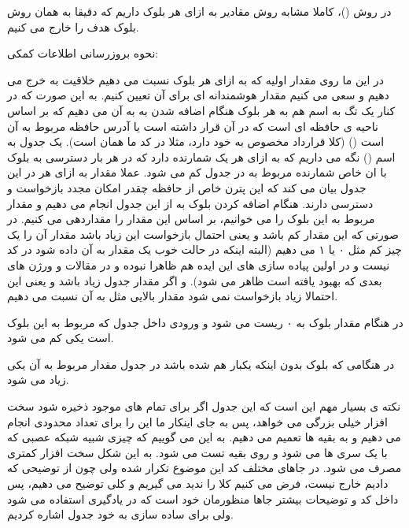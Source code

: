 \documentclass[12pt,a4paper]{article}
\begin{document}
در روش  ()، کاملا مشابه روش  مقادیر  به ازای هر بلوک داریم که دقیقا به همان روش  بلوک هدف را خارج می کنیم.

نحوه بروزرسانی اطلاعات کمکی:

در این  ما روی مقدار اولیه  که به ازای هر بلوک نسبت می دهیم خلاقیت به خرج می دهیم و سعی می کنیم مقدار هوشمندانه ای برای آن تعیین کنیم. به این صورت که در کنار  یک تگ به اسم  هم به هر بلوک هنگام اضافه شدن به  به آن می دهیم که بر اساس ناحیه ی حافظه ای است که در آن قرار داشته است یا آدرس حافظه مربوط به آن است () (کلا قرارداد مخصوص به خود دارد، مثلا در کد ما همان  است). یک جدول به اسم  () نگه می داریم که به ازای هر  یک شمارنده دارد که در هر بار دسترسی به بلوک با ان  خاص شمارنده مربوط به  در جدول کم می شود. عملا مقدار به ازای هر  در این جدول بیان می کند که این پترن خاص از حافظه چقدر امکان مجدد بازخواست و دسترسی دارند. هنگام اضافه کردن بلوک به  از این جدول  انجام می دهیم و مقدار مربوط به  این بلوک را می خوانیم، بر اساس این مقدار  را مقداردهی می کنیم. در صورتی که این مقدار کم باشد و یعنی احتمال بازخواست این  زیاد باشد مقدار  آن را یک چیز کم مثل ۰ یا ۱ می دهیم (البته اینکه در حالت خوب یک مقدار  به آن داده شود در کد نیست و در اولین پیاده سازی های این ایده هم ظاهرا نبوده و در مقالات و ورژن های بعدی که بهبود یافته است ظاهر می شود). و اگر مقدار جدول زیاد باشد و یعنی این  احتمالا زیاد بازخواست نمی شود مقدار  بالایی مثل  به آن نسبت می دهیم.

در هنگام  مقدار  بلوک به ۰ ریست می شود و ورودی داخل جدول  که مربوط به  این بلوک است یکی کم می شود.

در هنگامی که بلوک بدون اینکه یکبار هم  شده باشد در جدول مقدار مربوط به  آن یکی زیاد می شود.

نکته ی بسیار مهم این است که این جدول اگر برای تمام  های موجود ذخیره شود سخت افزار خیلی بزرگی می خواهد، پس به جای اینکار ما این را برای تعداد محدودی  انجام می دهیم و به بقیه  ها تعمیم می دهیم. به این  می گوییم که چیزی شبیه شبکه عصبی که با یک سری  ها  می شود و روی بقیه تست می شود. به این شکل سخت افزار کمتری مصرف می شود. در جاهای مختلف کد این موضوع تکرار شده ولی چون از توضیحی که دادیم خارج نیست، فرض می کنیم کلا  را ندید می گیریم و کلی توضیح می دهیم، پس داخل کد و توضیحات بیشتر جاها منظورمان خود  است که در یادگیری استفاده می شود ولی برای ساده سازی به خود جدول اشاره کردیم.
\end{document}

